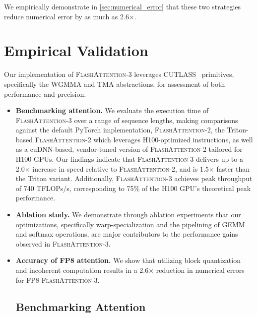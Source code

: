 \begin{enumerate}
\begin{enumerate}
We empirically demonstrate in \cref{sec:numerical_error} that these two strategies reduce numerical error by as much as 2.6$\times$.

\section{Empirical Validation}
\label{sec:exp}

Our implementation of \textsc{FlashAttention-3} leverages CUTLASS~\citep{Thakkar_CUTLASS_2023} primitives, specifically the WGMMA and TMA abstractions, for assessment of both performance and precision.

\begin{itemize}

\item \textbf{Benchmarking attention.} We evaluate the execution time of \textsc{FlashAttention-3} over a range of sequence lengths, making comparisons against the default PyTorch implementation, \textsc{FlashAttention-2}, the Triton-based \textsc{FlashAttention-2} which leverages H100-optimized instructions, as well as a cuDNN-based, vendor-tuned version of \textsc{FlashAttention-2} tailored for H100 GPUs. Our findings indicate that \textsc{FlashAttention-3} delivers up to a 2.0$\times$ increase in speed relative to \textsc{FlashAttention-2}, and is 1.5$\times$ faster than the Triton variant. Additionally, \textsc{FlashAttention-3} achieves peak throughput of 740 TFLOPs/s, corresponding to 75\% of the H100 GPU's theoretical peak performance.

\item \textbf{Ablation study.} We demonstrate through ablation experiments that our optimizations, specifically warp-specialization and the pipelining of GEMM and softmax operations, are major contributors to the performance gains observed in \textsc{FlashAttention-3}.

\item \textbf{Accuracy of FP8 attention.} We show that utilizing block quantization and incoherent computation results in a 2.6$\times$ reduction in numerical errors for FP8 \textsc{FlashAttention-3}.

\subsection{Benchmarking Attention}
\label{subsec:benchmark_attn}


\end{itemize}
\end{enumerate}
\end{enumerate}
